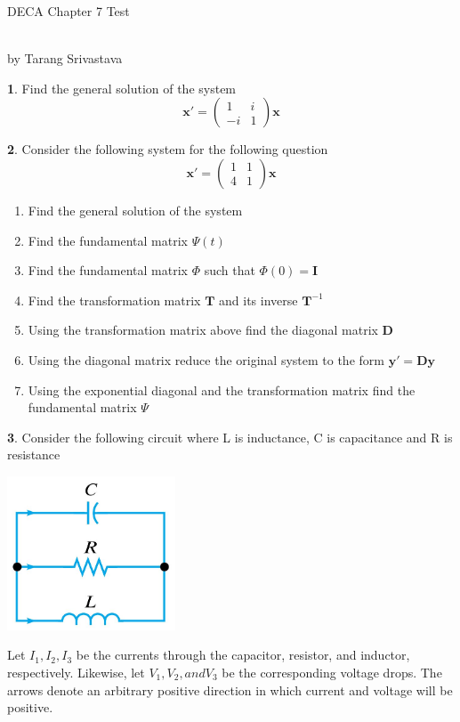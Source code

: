 \documentclass[11pt]{article}
\author{Tarang Srivastava}
\newcommand{\makechaptertitle}[1]{
\begin{center}
	\begin{large}
		DECA Chapter #1 Test
	\end{large}
	\begin{small}
		\\by Tarang Srivastava
	\end{small}
\end{center}
}
\theoremstyle{definition}
\newtheorem{q}{}
\begin{document}
	\begin{multicols*}{2}
		\makechaptertitle{7}
		\begin{q}
			Find the general solution of the system \[ \textbf{x}' = \left(\begin{matrix}
			1 & i \\
			-i & 1 
			\end{matrix}\right) \textbf{x}\]
		\end{q}
		\begin{q}
			Consider the following system for the following question\[ \textbf{x}' = \left(\begin{matrix}
			1 & 1 \\
			4 & 1 
			\end{matrix}\right) \textbf{x}\]
			\begin{enumerate}
				\item Find the general solution of the system 
				\item Find the fundamental matrix $ \Psi(t) $
				\item Find the fundamental matrix $ \Phi$ such that $ \Phi (0) = \textbf{I}$ 
				\item Find the transformation matrix $ \textbf{T}$ and its inverse $\textbf{T}^{-1}$ 
				\item Using the transformation matrix above find the diagonal matrix $ \textbf{D} $
				\item Using the diagonal matrix reduce the original system to the form $ \textbf{y}' = \textbf{Dy} $
				\item Using the exponential diagonal and the transformation matrix find the fundamental matrix $ \Psi $
			\end{enumerate}
		\end{q}
		\begin{q}
			Consider the following circuit where L is inductance, C is capacitance and R is resistance
			\begin{center}
				\includegraphics[width=5cm]{circuit}
			\end{center}
			Let $ I_1, I_2, I_3 $ be the currents through the capacitor, resistor, and inductor, respectively. Likewise, let $ V_1, V_2, and V_3 $ be the corresponding voltage drops. The arrows denote an arbitrary positive direction in which current and voltage will be positive. 

\end{q}
\end{multicols*}
\end{document}
